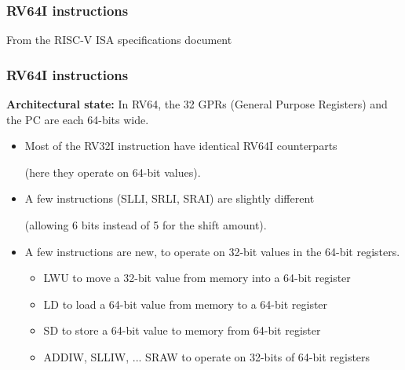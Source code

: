
\begin{frame}
\frametitle{RV64I instructions}

From the RISC-V ISA specifications document

\vspace{1ex}

\begin{center}
\end{center}

\end{frame}


\begin{frame}
\frametitle{RV64I instructions}

{\bf Architectural state:} In RV64, the 32 GPRs (General Purpose
Registers) and the PC are each 64-bits wide.

\vspace{2ex}

\begin{itemize}

\item Most of the RV32I instruction have identical RV64I counterparts

  {\footnotesize (here they operate on 64-bit values).}

\item A few instructions (SLLI, SRLI, SRAI) are slightly different

  {\footnotesize (allowing 6 bits instead of 5 for the shift amount).}

\item A few instructions are new, to operate on 32-bit values in the
  64-bit registers.
  {\footnotesize
    \begin{itemize}
    \item LWU to move a 32-bit value from memory into a 64-bit register
    \item LD to load a 64-bit value from memory to a 64-bit register
    \item SD to store a 64-bit value to memory from 64-bit register
    \item ADDIW, SLLIW, ... SRAW to operate on 32-bits of 64-bit registers
    \end{itemize}}

\end{itemize}

\end{frame}


